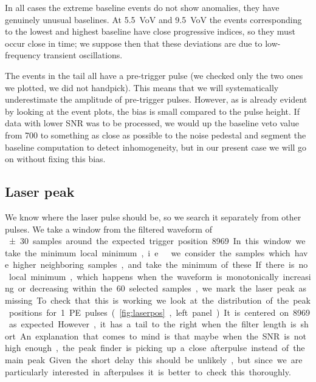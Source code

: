 \begin{figure}
    


\end{figure}

In all cases the extreme baseline events do not show anomalies, they have
genuinely unusual baselines. At \SI{5.5}{VoV} and \SI{9.5}{VoV} the events
corresponding to the lowest and highest baseline have close progressive
indices, so they must occur close in time; we suppose then that these
deviations are due to low-frequency transient oscillations.

The events in the tail all have a pre-trigger pulse (we checked only the two
ones we plotted, we did not handpick). This means that we will systematically
underestimate the amplitude of pre-trigger pulses. However, as is already
evident by looking at the event plots, the bias is small compared to the pulse
height. If data with lower SNR was to be processed, we would up the baseline
veto value from 700 to something as close as possible to the noise pedestal and
segment the baseline computation to detect inhomogeneity, but in our present
case we will go on without fixing this bias.

\subsection{Laser peak}
\label{sec:laser}

We know where the laser pulse should be, so we search it separately from other
pulses. We take a window from the filtered waveform of \SI{\pm 30} samples
around the expected trigger position 8969. In this window we take the minimum
local minimum, i.e.\ we consider the samples which have higher neighboring
samples, and take the minimum of these. If there is no local minimum, which
happens when the waveform is monotonically increasing or decreasing within the
60 selected samples, we mark the laser peak as missing.

To check that this is working we look at the distribution of the peak positions
for 1 PE pulses (\autoref{fig:laserpos}, left panel). It is centered on 8969 as
expected. However, it has a tail to the right when the filter length is short.
An explanation that comes to mind is that maybe when the SNR is not high
enough, the peak finder is picking up a close afterpulse instead of the main
peak. Given the short delay this should be unlikely, but since we are
particularly interested in afterpulses it is better to check this thoroughly.

